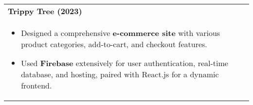 \documentclass[a4paper,8pt]{article}
\begin{document}
\begin{tabularx}{\linewidth}{ @{}l r@{} }
\textbf{{ Trippy Tree (2023)}} \hfill \color[HTML]{371e77} \\[1pt]
\begin{minipage}[t]{\linewidth}
    \begin{itemize}[nosep,after=\strut, leftmargin=2em, itemsep=2pt]
        \item Designed a comprehensive \textbf{e-commerce site} with various product categories, add-to-cart, and checkout features.
        \item Used \textbf{Firebase} extensively for user authentication, real-time database, and hosting, paired with React.js for a dynamic frontend.
    \end{itemize}
\end{minipage}
\end{tabularx}
\end{document}
